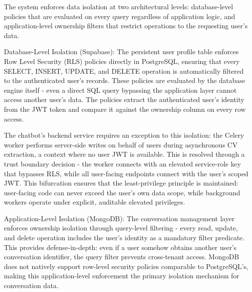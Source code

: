 \documentclass[12pt, a4paper]{report}
\begin{document}
\vspace{0.6cm}
\vspace{0.4cm}

The system enforces data isolation at two architectural levels: database-level policies that are evaluated on every query regardless of application logic, and application-level ownership filters that restrict operations to the requesting user's data.

Database-Level Isolation (Supabase): The persistent user profile table enforces Row Level Security (RLS) policies directly in PostgreSQL, ensuring that every SELECT, INSERT, UPDATE, and DELETE operation is automatically filtered to the authenticated user's records. These policies are evaluated by the database engine itself - even a direct SQL query bypassing the application layer cannot access another user's data. The policies extract the authenticated user's identity from the JWT token and compare it against the ownership column on every row access.

The chatbot's backend service requires an exception to this isolation: the Celery worker performs server-side writes on behalf of users during asynchronous CV extraction, a context where no user JWT is available. This is resolved through a trust boundary decision - the worker connects with an elevated service-role key that bypasses RLS, while all user-facing endpoints connect with the user's scoped JWT. This bifurcation ensures that the least-privilege principle is maintained: user-facing code can never exceed the user's own data scope, while background workers operate under explicit, auditable elevated privileges.

Application-Level Isolation (MongoDB): The conversation management layer enforces ownership isolation through query-level filtering - every read, update, and delete operation includes the user's identity as a mandatory filter predicate. This provides defense-in-depth: even if a user somehow obtains another user's conversation identifier, the query filter prevents cross-tenant access. MongoDB does not natively support row-level security policies comparable to PostgreSQL's, making this application-level enforcement the primary isolation mechanism for conversation data.

\vspace{0.6cm}
\vspace{0.4cm}
\end{document}
